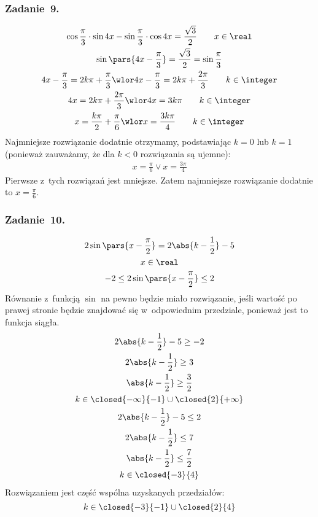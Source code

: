 \subsubsection*{Zadanie~9.}
\begin{gather*}
    \cos\frac{\pi}{3} \cdot \sin4x - \sin\frac{\pi}{3} \cdot \cos4x = \frac{\sqrt{3}}{2} \qquad x \in \real\\
    \sin\pars{4x - \frac{\pi}{3}} = \frac{\sqrt{3}}{2} = \sin\frac{\pi}{3}\\
    4x - \frac{\pi}{3} = 2k\pi + \frac{\pi}{3} \wlor 4x - \frac{\pi}{3} = 2k\pi + \frac{2\pi}{3} \qquad k \in \integer\\
    4x = 2k\pi + \frac{2\pi}{3} \wlor 4x = 3k\pi \qquad k \in \integer\\
    x = \frac{k\pi}{2} + \frac{\pi}{6} \wlor x = \frac{3k\pi}{4} \qquad k \in \integer
\end{gather*}
Najmniejsze rozwiązanie dodatnie otrzymamy, podstawiając \(k = 0\) lub \(k = 1\) (ponieważ zauważamy, że dla \(k < 0\) rozwiązania są ujemne):
\begin{gather*}
    x = \frac{\pi}{6} \lor x = \frac{3\pi}{4}
\end{gather*}
Pierwsze z~tych rozwiązań jest mniejsze. Zatem najmniejsze rozwiązanie dodatnie to \(x = \frac{\pi}{6}\).
\subsubsection*{Zadanie~10.}
\begin{gather*}
    2\sin\pars{x - \frac{\pi}{2}} = 2\abs{k - \frac{1}{2}} - 5\\
    x \in \real\\
    -2 \leq 2\sin\pars{x - \frac{\pi}{2}} \leq 2
\end{gather*}
Równanie z~funkcją \(\sin\) na pewno będzie miało rozwiązanie, jeśli wartość po prawej stronie będzie znajdować się w~odpowiednim przedziale, ponieważ jest to funkcja siągła.
\begin{gather*}
    2\abs{k - \frac{1}{2}} - 5 \geq -2\\
    2\abs{k - \frac{1}{2}} \geq 3\\
    \abs{k - \frac{1}{2}} \geq \frac{3}{2}\\
    k \in \closed{-\infty}{-1} \cup \closed{2}{+\infty}\\
    2\abs{k - \frac{1}{2}} - 5 \leq 2\\
    2\abs{k - \frac{1}{2}} \leq 7\\
    \abs{k - \frac{1}{2}} \leq \frac{7}{2}\\
    k \in \closed{-3}{4}
\end{gather*}
Rozwiązaniem jest część wspólna uzyskanych przedziałów:
\begin{equation*}
    k \in \closed{-3}{-1} \cup \closed{2}{4}
\end{equation*}
